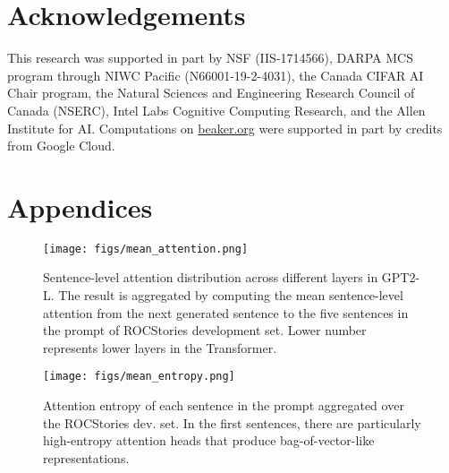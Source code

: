 \documentclass[11pt,a4paper]{article}
\begin{document}


\section*{Acknowledgements}
This research was supported in part by NSF (IIS-1714566), DARPA MCS program through NIWC Pacific (N66001-19-2-4031), the Canada CIFAR AI Chair program, the Natural Sciences and Engineering Research Council of Canada (NSERC), Intel Labs Cognitive Computing Research, and the Allen Institute for AI. 
Computations on \url{beaker.org} were supported in part by credits from Google Cloud. 



\clearpage
\appendix

\appendix \label{sec:appendix}
\section{Appendices}

\begin{figure}[t]
\centering
\texttt{[image: figs/mean\_attention.png]}
\caption{Sentence-level attention distribution %
across different layers in GPT2-L. The result is aggregated by computing the mean sentence-level attention from the next generated sentence to the five sentences in the prompt of ROCStories development set. Lower number represents lower layers in the Transformer.}
\label{fig:sentence_level_attention_portion}
\end{figure} 
\begin{figure}[t]
\centering
\texttt{[image: figs/mean\_entropy.png]}
\caption{Attention entropy of each sentence in the prompt aggregated over the ROCStories dev. set. In the
first sentences, there are particularly high-entropy attention heads that
produce bag-of-vector-like representations.}
\label{fig:mean_entropy}
\end{figure} 
\end{document}
